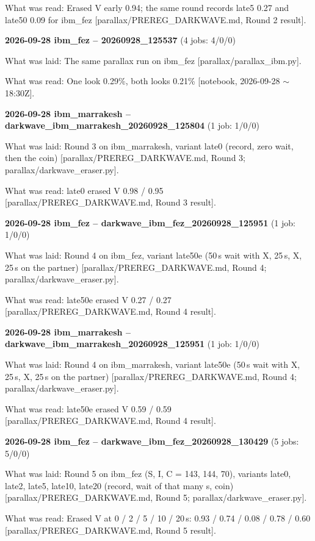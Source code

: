 \documentclass[11pt]{article}
\begin{document}
What was read: Erased V early 0.94; the same round records late5 0.27 and late50 0.09 for ibm\_fez {[}parallax/PREREG\_DARKWAVE.md, Round 2 result{]}.

\textbf{2026-09-28 ibm\_fez -- 20260928\_125537} (4 jobs: 4/0/0)

What was laid: The same parallax run on ibm\_fez {[}parallax/parallax\_ibm.py{]}.

What was read: One look 0.29\%, both looks 0.21\% {[}notebook, 2026-09-28 \(\sim\)18:30Z{]}.

\textbf{2026-09-28 ibm\_marrakesh -- darkwave\_ibm\_marrakesh\_20260928\_125804} (1 job: 1/0/0)

What was laid: Round 3 on ibm\_marrakesh, variant late0 (record, zero wait, then the coin) {[}parallax/PREREG\_DARKWAVE.md, Round 3; parallax/darkwave\_eraser.py{]}.

What was read: late0 erased V 0.98 / 0.95 {[}parallax/PREREG\_DARKWAVE.md, Round 3 result{]}.

\textbf{2026-09-28 ibm\_fez -- darkwave\_ibm\_fez\_20260928\_125951} (1 job: 1/0/0)

What was laid: Round 4 on ibm\_fez, variant late50e (50\,\textmu s wait with X, 25\,\textmu s, X, 25\,\textmu s on the partner) {[}parallax/PREREG\_DARKWAVE.md, Round 4; parallax/darkwave\_eraser.py{]}.

What was read: late50e erased V 0.27 / 0.27 {[}parallax/PREREG\_DARKWAVE.md, Round 4 result{]}.

\textbf{2026-09-28 ibm\_marrakesh -- darkwave\_ibm\_marrakesh\_20260928\_125951} (1 job: 1/0/0)

What was laid: Round 4 on ibm\_marrakesh, variant late50e (50\,\textmu s wait with X, 25\,\textmu s, X, 25\,\textmu s on the partner) {[}parallax/PREREG\_DARKWAVE.md, Round 4; parallax/darkwave\_eraser.py{]}.

What was read: late50e erased V 0.59 / 0.59 {[}parallax/PREREG\_DARKWAVE.md, Round 4 result{]}.

\textbf{2026-09-28 ibm\_fez -- darkwave\_ibm\_fez\_20260928\_130429} (5 jobs: 5/0/0)

What was laid: Round 5 on ibm\_fez (S, I, C = 143, 144, 70), variants late0, late2, late5, late10, late20 (record, wait of that many \textmu s, coin) {[}parallax/PREREG\_DARKWAVE.md, Round 5; parallax/darkwave\_eraser.py{]}.

What was read: Erased V at 0 / 2 / 5 / 10 / 20\,\textmu s: 0.93 / 0.74 / 0.08 / 0.78 / 0.60 {[}parallax/PREREG\_DARKWAVE.md, Round 5 result{]}.
\end{document}
